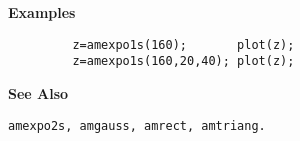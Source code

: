 {\bf \large \sf Examples}
\begin{verbatim}
         z=amexpo1s(160);       plot(z);
         z=amexpo1s(160,20,40); plot(z);
\end{verbatim}
\vspace*{.5cm}


{\bf \large \sf See Also}\\
\hspace*{1.5cm}
\begin{minipage}[t]{13.5cm}
\begin{verbatim}
amexpo2s, amgauss, amrect, amtriang.
\end{verbatim}
\end{minipage}


